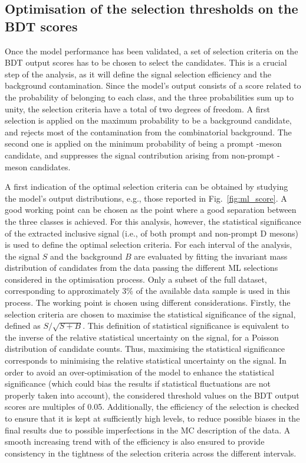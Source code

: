 \subsection{Optimisation of the selection thresholds on the BDT scores}
Once the model performance has been validated, a set of selection criteria on the BDT output scores has to be chosen to select the candidates. This is a crucial step of the analysis, as it will define the signal selection efficiency and the background contamination. Since the model's output consists of a score related to the probability of belonging to each class, and the three probabilities sum up to unity, the selection criteria have a total of two degrees of freedom. A first selection is applied on the maximum probability to be a background candidate, and rejects most of the contamination from the combinatorial background. The second one is applied on the minimum probability of being a prompt \ds-meson candidate, and suppresses the signal contribution arising from non-prompt \ds-meson candidates. 

A first indication of the optimal selection criteria can be obtained by studying the model's output distributions, e.g., those reported in Fig.~\ref{fig:ml_score}. A good working point can be chosen as the point where a good separation between the three classes is achieved. For this analysis, however, the statistical significance of the extracted inclusive signal (i.e., of both prompt and non-prompt D mesons) is used to define the optimal selection criteria. For each \pt interval of the analysis, the signal $S$ and the background $B$ are evaluated by fitting the invariant mass distribution of candidates from the data passing the different ML selections considered in the optimisation process. Only a subset of the full dataset, corresponding to approximately 3\% of the available data sample is used in this process. The working point is chosen using different considerations. Firstly, the selection criteria are chosen to maximise the statistical significance of the signal, defined as $S/\sqrt{S+B}$. This definition of statistical significance is equivalent to the inverse of the relative statistical uncertainty on the signal, for a Poisson distribution of candidate counts. Thus, maximising the statistical significance corresponds to minimising the relative statistical uncertainty on the signal. In order to avoid an over-optimisation of the model to enhance the statistical significance (which could bias the results if statistical fluctuations are not properly taken into account), the considered threshold values on the BDT output scores are multiples of 0.05. Additionally, the efficiency of the selection is checked to ensure that it is kept at sufficiently high levels, to reduce possible biases in the final results due to possible imperfections in the MC description of the data. A smooth increasing trend with \pt of the efficiency is also ensured to provide consistency in the tightness of the selection criteria across the different \pt intervals. 

